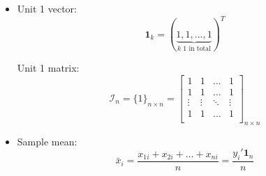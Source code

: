     \begin{itemize}[topsep=6pt,itemsep=4pt]
        \item Unit 1 vector:
        \begin{equation}
            \mathbf{1}_k=(\underbrace{1,1,\ldots,1}_{k\text{ 1 in total}})^T
        \end{equation}

        Unit 1 matrix:
        \begin{equation}\label{EqaAllOneMatrix}
            \mathcal{I}_n  = \{1\}_{n\times n}=\begin{bmatrix}
            1&1&\ldots&1\\
            1&1&\ldots&1\\
            \vdots&\vdots&\ddots&\vdots\\
            1&1&\ldots&1\\
            \end{bmatrix}_{n\times n}
        \end{equation}


        \item Sample mean:
        \begin{equation}
            \bar{x}_i=\dfrac{x_{1i}+x_{2i}+\ldots+x_{ni}}{n}=\dfrac{y_i'\mathbf{1}_n}{n}
        \end{equation}
        

\end{itemize}
